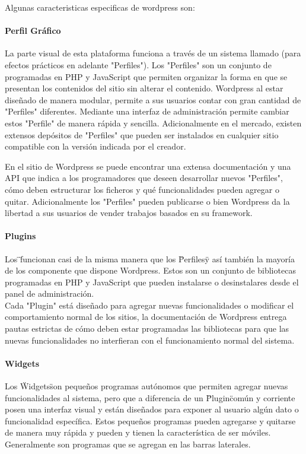 Algunas caracteristicas especificas de wordpress son:

\paragraph{Perfil Gráfico}	
La parte visual de esta plataforma funciona a través de un sistema llamado (para efectos prácticos en adelante "Perfiles"). Los "Perfiles" son un conjunto de  programadas en PHP y JavaScript que permiten organizar la forma en que se presentan los contenidos del sitio sin alterar el contenido. Wordpress al estar diseñado de manera modular, permite a sus usuarios contar con gran cantidad de "Perfiles" diferentes. Mediante una interfaz de administración permite cambiar estos "Perfile" de manera rápida y sencilla. Adicionalmente en el mercado, existen extensos depósitos de "Perfiles" que pueden ser instalados en cualquier sitio compatible con la versión indicada por el creador.

En el sitio de Wordpress se puede encontrar una extensa documentación y una API que indica a los programadores que deseen desarrollar nuevos "Perfiles", cómo deben estructurar los ficheros y qué funcionalidades pueden agregar o quitar. Adicionalmente los "Perfiles" pueden publicarse o bien Wordpress da la libertad a sus usuarios de vender trabajos basados en su framework.\\

\paragraph{Plugins}
Los \"\"  funcionan casi de la misma manera que los \"Perfiles\" y así también la mayoría de los componente que dispone Wordpress. Estos son un conjunto de bibliotecas programadas en PHP y JavaScript que pueden instalarse o desinstalares desde el panel de administración.\\
Cada "Plugin" está diseñado para agregar nuevas funcionalidades o modificar el comportamiento normal de los sitios, la documentación de Wordpress entrega pautas estrictas de cómo deben estar programadas las bibliotecas para que las nuevas funcionalidades no interfieran con el funcionamiento normal del sistema.

\paragraph{Widgets}
Los \"Widgets\" son pequeños programas autónomos que permiten agregar nuevas funcionalidades al sistema, pero que a diferencia de un \"Plugin\" común y corriente posen una interfaz visual y están diseñados para exponer al usuario algún dato o funcionalidad específica. Estos pequeños programas pueden agregarse y quitarse de manera muy rápida y pueden y tienen la característica de ser móviles. Generalmente son programas que se agregan en las barras laterales.

